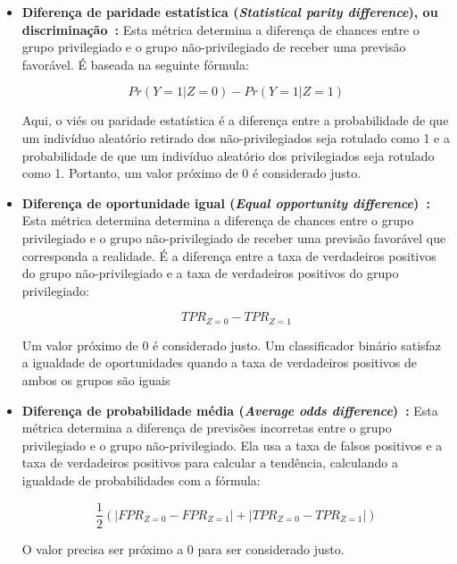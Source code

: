 \documentclass[portugues]{ic-tese}
\begin{document}
\begin{itemize}
\item \textbf{Diferença de paridade estatística (\textit{Statistical parity difference}), ou discriminação~\citep{Zemel_2013}:} Esta métrica determina a diferença de chances entre o grupo privilegiado e o grupo não-privilegiado de receber uma previsão favorável. É baseada na seguinte fórmula:

\begin{equation}
Pr(Y=1|Z=0)-Pr(Y=1|Z=1)
\end{equation}
 
Aqui, o viés ou paridade estatística é a diferença entre a probabilidade de que um indivíduo aleatório retirado dos não-privilegiados seja rotulado como 1 e a probabilidade de que um indivíduo aleatório dos privilegiados seja rotulado como 1. Portanto, um valor próximo de 0 é considerado justo.

\item \textbf{Diferença de oportunidade igual (\textit{Equal opportunity difference})~\citep{Biswas_2020}:} Esta métrica determina determina a diferença de chances entre o grupo privilegiado e o grupo não-privilegiado de receber uma previsão favorável que corresponda a realidade. É a diferença entre a taxa de verdadeiros positivos do grupo não-privilegiado e a taxa de verdadeiros positivos do grupo privilegiado:

\begin{equation}
TPR_{Z=0} - TPR_{Z=1}
\end{equation}
 
Um valor próximo de 0 é considerado justo. Um classificador binário satisfaz a igualdade de oportunidades quando a taxa de verdadeiros positivos de ambos os grupos são iguais~\citep{Hardt_2016}

\item \textbf{Diferença de probabilidade média (\textit{Average odds difference})~\citep{Biswas_2020}:} Esta métrica determina a diferença de previsões incorretas entre o grupo privilegiado e o grupo não-privilegiado. Ela usa a taxa de falsos positivos e a taxa de verdadeiros positivos para calcular a tendência, calculando a igualdade de probabilidades com a fórmula:

\begin{equation}
\frac{1}{2}(|FPR_{Z=0} - FPR_{Z=1}|+|TPR_{Z=0} - TPR_{Z=1}|)
\end{equation}
 
O valor precisa ser próximo a 0 para ser considerado justo.


\end{itemize}
\end{document}
